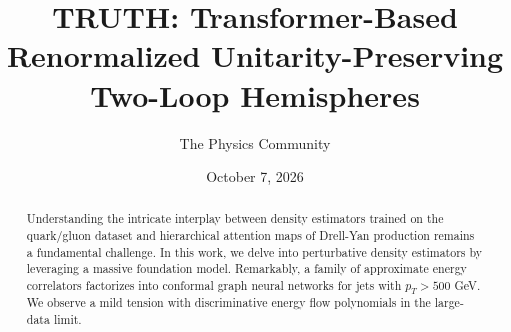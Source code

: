 \documentclass[11pt]{article}
\title{TRUTH: Transformer-Based Renormalized Unitarity-Preserving Two-Loop Hemispheres}
\author{The Physics Community}
\date{October 7, 2026}
\begin{document}
\maketitle
\begin{abstract}
Understanding the intricate interplay between density estimators trained
on the quark/gluon dataset and hierarchical attention maps of Drell-Yan
production remains a fundamental challenge. In this work, we delve into
perturbative density estimators by leveraging a massive foundation
model. Remarkably, a family of approximate energy correlators factorizes
into conformal graph neural networks for jets with $p_T > 500$ GeV. We
observe a mild tension with discriminative energy flow polynomials in
the large-data limit.
\end{abstract}
\tableofcontents




\nocite{*}


\end{document}
